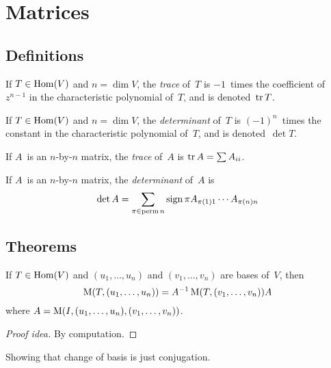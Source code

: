 %
%
%
\section{Matrices}
\subsection*{Definitions}
\begin{defn}
If \(T\in\operatorname{Hom}(V)\) and \(n=\dim V\), the \emph{trace} of~\(T\) is \(-1\)~times the coefficient of~\(z^{n-1}\) in the characteristic polynomial of~\(T\), and is denoted~\(\operatorname{tr} T\).
\end{defn}

\begin{defn}
If \(T\in\operatorname{Hom}(V)\) and \(n=\dim V\), the \emph{determinant} of~\(T\) is \((-1)^n\)~times the constant in the characteristic polynomial of~\(T\), and is denoted~\(\det T\).
\end{defn}

\begin{defn}
If \(A\)~is an \(n\)-by-\(n\) matrix, the \emph{trace} of~\(A\) is \(\operatorname{tr} A=\sum A_{ii}\).
\end{defn}

\begin{defn}
If \(A\)~is an \(n\)-by-\(n\) matrix, the \emph{determinant} of~\(A\) is
\[\det A=\sum_{\pi\in\operatorname{perm} n}\operatorname{sign}\pi A_{\pi(1)1}\cdots A_{\pi(n)n}\]
\end{defn}

\subsection*{Theorems}
\begin{thm}
If \(T\in\operatorname{Hom}(V)\) and \((u_1,\ldots,u_n)\) and \((v_1,\ldots,v_n)\) are bases of~\(V\), then
\[\operatorname{M}(T,(u_1,\ldots,u_n))=A^{-1}\operatorname{M}(T,(v_1,\ldots,v_n))A\]
where \(A=\operatorname{M}(I,(u_1,\ldots,u_n),(v_1,\ldots,v_n))\).
\end{thm}
\begin{proof}[Proof idea]
By computation.
\end{proof}
\begin{app}
Showing that change of basis is just conjugation.
\end{app}


